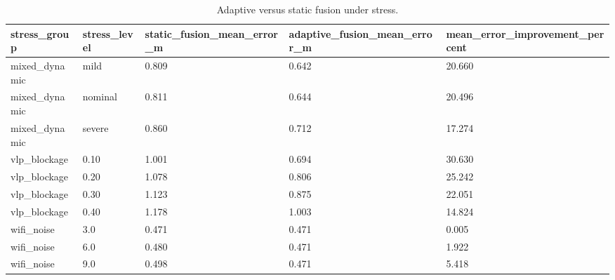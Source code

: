\begin{table}[t]
\centering
\small
\caption{Adaptive versus static fusion under stress.}
\label{tab:stress_adaptive_static}
\begin{tabular}{lllll}
\toprule
stress\_group & stress\_level & static\_fusion\_mean\_error\_m & adaptive\_fusion\_mean\_error\_m & mean\_error\_improvement\_percent \\
\midrule
mixed\_dynamic & mild & 0.809 & 0.642 & 20.660 \\
mixed\_dynamic & nominal & 0.811 & 0.644 & 20.496 \\
mixed\_dynamic & severe & 0.860 & 0.712 & 17.274 \\
vlp\_blockage & 0.10 & 1.001 & 0.694 & 30.630 \\
vlp\_blockage & 0.20 & 1.078 & 0.806 & 25.242 \\
vlp\_blockage & 0.30 & 1.123 & 0.875 & 22.051 \\
vlp\_blockage & 0.40 & 1.178 & 1.003 & 14.824 \\
wifi\_noise & 3.0 & 0.471 & 0.471 & 0.005 \\
wifi\_noise & 6.0 & 0.480 & 0.471 & 1.922 \\
wifi\_noise & 9.0 & 0.498 & 0.471 & 5.418 \\
\bottomrule
\end{tabular}
\end{table}
